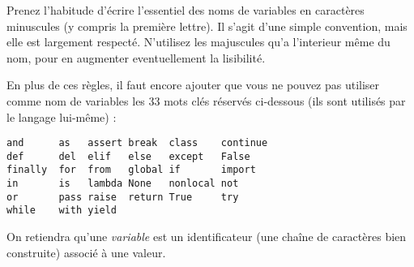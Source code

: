 Prenez l'habitude d'écrire l'essentiel des noms de variables en caractères minuscules (y compris la première lettre). Il s'agit d'une simple convention, mais elle est largement respecté. N'utilisez les majuscules qu'a l'interieur même du nom, pour en augmenter eventuellement la lisibilité.\par
En plus de ces règles, il faut encore ajouter que vous ne pouvez pas utiliser comme nom de variables les 33  mots clés réservés  ci-dessous (ils sont utilisés par le langage lui-même) :
\begin{lstlisting}
and      as   assert break  class    continue 
def      del  elif   else   except   False 
finally  for  from   global if       import 
in       is   lambda None   nonlocal not    
or       pass raise  return True     try
while    with yield
\end{lstlisting}
On retiendra qu'une \emph{variable }  est un identificateur (une chaîne de caractères bien construite) associé à une valeur. 
